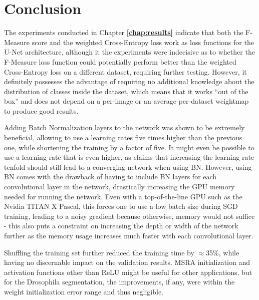 \chapter {Conclusion}
\label{chap:conclusion}

The experiments conducted in Chapter \textbf{\ref{chap:results}} indicate that both the F-Measure score and the weighted Cross-Entropy loss work as loss functions for the U-Net architecture, although it the experiments were indecisive as to whether the F-Measure loss function could potentially perform better than the weighted Cross-Entropy loss on a different dataset, requiring further testing. However, it definitely possesses the advantage of requiring no additional knowledge about the distribution of classes inside the dataset, which means that it works ``out of the box'' and does not depend on a per-image or an average per-dataset weightmap to produce good results.

Adding Batch Normalization layers to the network was shown to be extremely beneficial, allowing to use a learning rates five times higher than the previous one, while shortening the training by a factor of five. It might even be possible to use a learning rate that is even higher, as \cite{batchnorm} claims that increasing the learning rate tenfold should still lead to a converging network when using BN. However, using BN comes with the drawback of having to include BN layers for each convolutional layer in the network, drastically increasing the GPU memory needed for running the network. Even with a top-of-the-line GPU such as the Nvidia TITAN X Pascal, this forces one to use a low batch size during SGD training, leading to a noisy gradient because otherwise, memory would not suffice - this also puts a constraint on increasing the depth or width of the network further as the memory usage increases much faster with each convolutional layer.

Shuffling the training set further reduced the training time by $\approx$35\%, while having no discernable impact on the validation results. MSRA initialization and activation functions other than ReLU might be useful for other applications, but for the Drosophila segmentation, the improvements, if any, were within the weight initialization error range and thus negligible.

